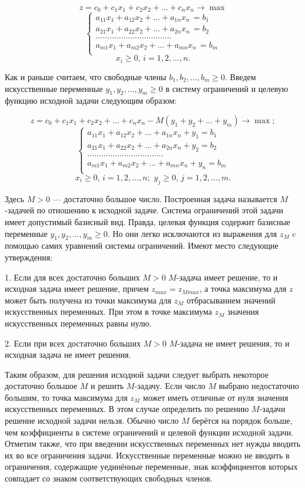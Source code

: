 \[z=c_0+c_1x_1+c_2x_2+\dots+c_nx_n \rightarrow \max \]
$$
\left\{
\begin{array}{ll}
	a_{11}x_1+a_{12}x_2+\dots+a_{1n}x_n \, = b_1 \\
	a_{21}x_1+a_{22}x_2+\dots+a_{2n}x_n \, = b_2 \\
	\dots\dots\dots\dots\dots\dots\dots\dots\dots\dots\dots\\
	a_{m1}x_1+a_{m2}x_2+\dots+a_{mn}x_n \, = b_m \\
\end{array}
\right.
$$
\[ x_i \geq 0, \, i=1,2,\dots, n.\]

Как и раньше считаем, что свободные члены $b_1, b_2, \dots, b_m \geq 0$. Введем искусственные переменные $y_1, y_2, \dots, y_m \geq 0$ в систему ограничений и целевую функцию исходной задачи следующим образом:

\[z=c_0+c_1x_1+c_2x_2+\dots+c_nx_n -M(y_1+y_2+\dots+y_m) \rightarrow \max; \]
$$
\left\{
\begin{array}{ll}
	a_{11}x_1+a_{12}x_2+\dots+a_{1n}x_n +y_1 = b_1 \\
	a_{21}x_1+a_{22}x_2+\dots+a_{2n}x_n +y_2 = b_2 \\
	\dots\dots\dots\dots\dots\dots\dots\dots\dots\dots\dots\\
	a_{m1}x_1+a_{m2}x_2+\dots+a_{mn}x_n +y_n = b_m \\
\end{array}
\right.
$$
\[ x_i \geq 0, \, i=1,2,\dots, n;\,\, y_j \geq 0,\, j=1,2,\dots, m.\]

Здесь $M>0$ — достаточно большое число. Построенная задача называется $M$-задачей по отношению к исходной задаче. Система ограничений этой задачи имеет допустимый базисный вид. Правда, целевая функция содержит базисные переменные $y_1, y_2, \dots, y_m \geq 0$. Но они легко исключаются из выражения для $z_M$ c помощью самих уравнений системы ограничений. Имеют место следующие утверждения:

1. Если для всех достаточно больших  $M>0$  $M$-задача  имеет решение, то и исходная задача имеет решение, причем $z_{max} = z_{Mmax}$, а точка максимума для $z$ может  быть получена из точки максимума  для  $z_M$ отбрасыванием значений искусственных переменных. При этом в точке максимума $z_M$ значения искусственных переменных равны нулю.

2. Если при всех достаточно больших $M>0$ $M$-задача не имеет решения, то и исходная задача не имеет решения.

Таким образом, для решения исходной задачи следует выбрать некоторое достаточно большое $M$ и решить $M$-задачу. Если число $M$ выбрано недостаточно большим, то точка максимума для $z_M$ может иметь отличные от нуля значения искусственных переменных. В этом случае определить по решению $M$-задачи решение исходной задачи нельзя. Обычно число $M$ берётся на порядок больше, чем коэффициенты в системе ограничений и целевой функции исходной задачи. Отметим также, что при введении искусственных переменных нет нужды вводить их во все ограничения задачи. Искусственные переменные можно не вводить в ограничения, содержащие уединённые переменные, знак коэффициентов которых совпадает со знаком соответствующих свободных членов.

